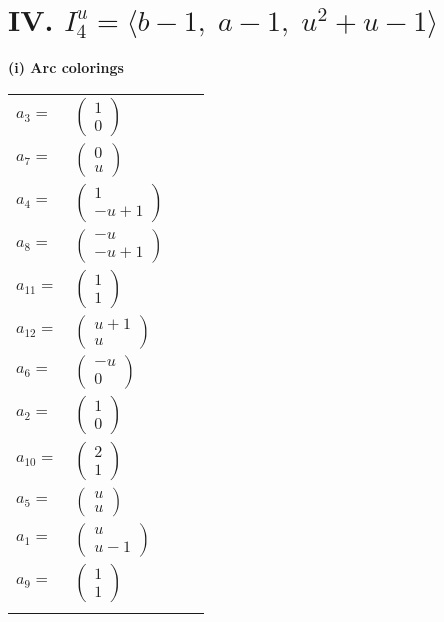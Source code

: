 \documentclass[1p]{elsarticle_modified}
\theoremstyle{definition}
\begin{document}
\centering \section*{IV. $I^u_{4}= \langle b-1,\;a-1,\;u^2+u-1 \rangle$}
\flushleft \textbf{(i) Arc colorings}\\
\begin{tabular}{m{7pt} m{180pt} m{7pt} m{180pt} }
\flushright $a_{3}=$&$\begin{pmatrix}1\\0\end{pmatrix}$ \\
\flushright $a_{7}=$&$\begin{pmatrix}0\\u\end{pmatrix}$ \\
\flushright $a_{4}=$&$\begin{pmatrix}1\\- u+1\end{pmatrix}$ \\
\flushright $a_{8}=$&$\begin{pmatrix}- u\\- u+1\end{pmatrix}$ \\
\flushright $a_{11}=$&$\begin{pmatrix}1\\1\end{pmatrix}$ \\
\flushright $a_{12}=$&$\begin{pmatrix}u+1\\u\end{pmatrix}$ \\
\flushright $a_{6}=$&$\begin{pmatrix}- u\\0\end{pmatrix}$ \\
\flushright $a_{2}=$&$\begin{pmatrix}1\\0\end{pmatrix}$ \\
\flushright $a_{10}=$&$\begin{pmatrix}2\\1\end{pmatrix}$ \\
\flushright $a_{5}=$&$\begin{pmatrix}u\\u\end{pmatrix}$ \\
\flushright $a_{1}=$&$\begin{pmatrix}u\\u-1\end{pmatrix}$ \\
\flushright $a_{9}=$&$\begin{pmatrix}1\\1\end{pmatrix}$\\&\end{tabular}
\end{document}
